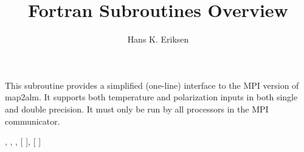 
\sloppy


\title{\healpix Fortran Subroutines Overview}
 \section[mpi\_map2alm\_simple*]{ }
\label{sub:mpi_map2alm_simple}
\author{Hans K. Eriksen}

\begin{facility}
{This subroutine provides a simplified (one-line) interface to the MPI version of
map2alm. It supports both temperature and polarization inputs in both
single and double precision. It must only be run by all processors in 
the MPI communicator.
}
{\modMpiAlmTools}
\end{facility}

\begin{f90format}
{%
, %
, %
, [%
], [%
]}
\end{f90format}

